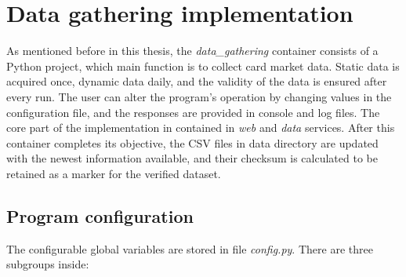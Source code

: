 \chapter{Data gathering implementation}
\label{ch:gathering}
As mentioned before in this thesis, the \textit{data\_gathering} container consists of a Python project, which main function is to collect card market data. Static data is acquired once, dynamic data daily, and the validity of the data is ensured after every run. The user can alter the program's operation by changing values in the configuration file, and the responses are provided in console and log files. The core part of the implementation in contained in \textit{web} and \textit{data} services. After this container completes its objective, the CSV files in data directory are updated with the newest information available, and their checksum is calculated to be retained as a marker for the verified dataset.


\section{Program configuration}
The configurable global variables are stored in file \textit{config.py}. There are three subgroups inside:

